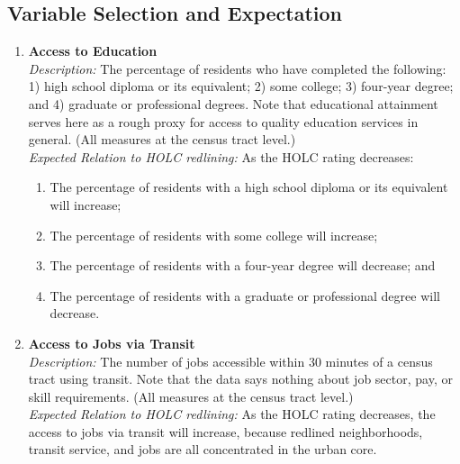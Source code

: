 \documentclass[paper=letter, fontsize=12pt]{scrartcl} %
\begin{document}
	\subsection{Variable Selection and Expectation}
	\begin{enumerate}
		\item \textbf{Access to Education}\\
		\textit{Description:} The percentage of residents who have completed the following: 1) high school diploma or its equivalent; 2) some college; 3) four-year degree; and 4) graduate or professional degrees. Note that educational attainment serves here as a rough proxy for access to quality education services in general. (All measures at the census tract level.)\\
		\textit{Expected Relation to HOLC redlining:} As the HOLC rating decreases:
		\begin{enumerate}
			\item The percentage of residents with a high school diploma or its equivalent will increase;
			\item The percentage of residents with some college will increase;
			\item The percentage of residents with a four-year degree will decrease; and
			\item The percentage of residents with a graduate or professional degree will decrease.
		\end{enumerate}
		
		\item \textbf{Access to Jobs via Transit}\\
		\textit{Description:} The number of jobs accessible within 30 minutes of a census tract using transit. Note that the data says nothing about job sector, pay, or skill requirements. (All measures at the census tract level.)\\
		\textit{Expected Relation to HOLC redlining:} As the HOLC rating decreases, the access to jobs via transit will increase, because redlined neighborhoods, transit service, and jobs are all concentrated in the urban core.
		

\end{enumerate}
\end{document}
